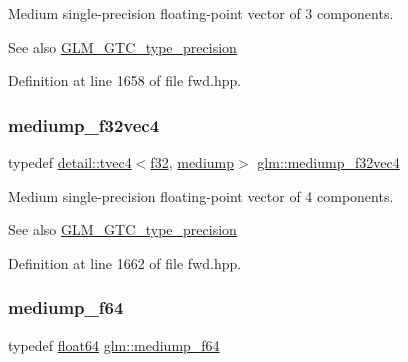 Medium single-\/precision floating-\/point vector of 3 components. \begin{DoxySeeAlso}{See also}
\hyperlink{group__gtc__type__precision}{G\+L\+M\+\_\+\+G\+T\+C\+\_\+type\+\_\+precision} 
\end{DoxySeeAlso}


Definition at line 1658 of file fwd.\+hpp.

\mbox{\label{group__gtc__type__precision_gaa5a1b058d185d87504591a11c6247518}} 
\subsubsection{\texorpdfstring{mediump\+\_\+f32vec4}{mediump\_f32vec4}}
{\footnotesize\ttfamily typedef \hyperlink{structglm_1_1detail_1_1tvec4}{detail\+::tvec4}$<$\hyperlink{group__gtc__type__precision_ga0ec999b57f5330d9021256e96038df04}{f32}, \hyperlink{namespaceglm_a0f04f086094c747d227af4425893f545a6416f3ea0c9025fb21ed50c4d6620482}{mediump}$>$ \hyperlink{group__gtc__type__precision_gaa5a1b058d185d87504591a11c6247518}{glm\+::mediump\+\_\+f32vec4}}

Medium single-\/precision floating-\/point vector of 4 components. \begin{DoxySeeAlso}{See also}
\hyperlink{group__gtc__type__precision}{G\+L\+M\+\_\+\+G\+T\+C\+\_\+type\+\_\+precision} 
\end{DoxySeeAlso}


Definition at line 1662 of file fwd.\+hpp.

\mbox{\label{group__gtc__type__precision_gabd273bd38ea5e013aeec9ffd2b2591fb}} 
\subsubsection{\texorpdfstring{mediump\+\_\+f64}{mediump\_f64}}
{\footnotesize\ttfamily typedef \hyperlink{group__gtc__type__precision_gab721f828b41f46b20cf4883b50733d3b}{float64} \hyperlink{group__gtc__type__precision_gabd273bd38ea5e013aeec9ffd2b2591fb}{glm\+::mediump\+\_\+f64}}

